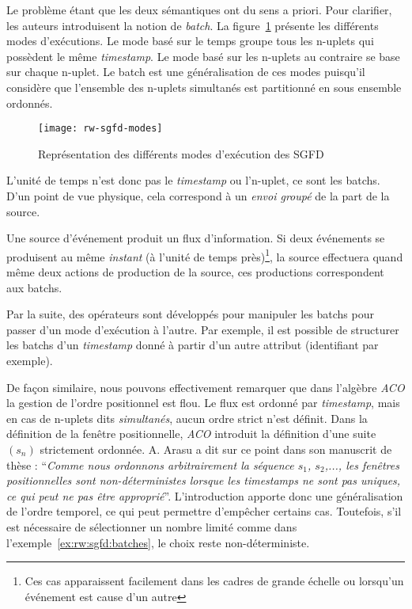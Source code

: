 Le problème étant que les deux sémantiques ont du sens a priori. Pour clarifier, les auteurs introduisent la notion de \textit{batch}. La figure~\ref{fig:rw:sgfd:modes} présente les différents modes d'exécutions. Le mode basé sur le temps groupe tous les n-uplets qui possèdent le même \textit{timestamp}. Le mode basé sur les n-uplets au contraire se base sur chaque n-uplet. Le batch est une généralisation de ces modes puisqu'il considère que l'ensemble des n-uplets simultanés est partitionné en sous ensemble ordonnés.
\begin{figure}[ht]
    \centering
    \texttt{[image: rw-sgfd-modes]}
    \caption{Représentation des différents modes d'exécution des SGFD}\label{fig:rw:sgfd:modes}
\end{figure}
L'unité de temps n'est donc pas le \textit{timestamp} ou l'n-uplet, ce sont les batchs. D'un point de vue physique, cela correspond à un \textit{envoi groupé} de la part de la source.
\begin{example}
Une source d'événement produit un flux d'information. Si deux événements se produisent au même \textit{instant} (à l'unité de temps près)\footnote{Ces cas apparaissent facilement dans les cadres de grande échelle ou lorsqu'un événement est cause d'un autre}, la source effectuera quand même deux actions de production de la source, ces productions correspondent aux batchs.
\end{example}

Par la suite, des opérateurs sont développés pour manipuler les batchs pour passer d'un mode d'exécution à l'autre. Par exemple, il est possible de structurer les batchs d'un \textit{timestamp} donné à partir d'un autre attribut (identifiant par exemple).

De façon similaire, nous pouvons effectivement remarquer que dans l'algèbre \textit{ACO} la gestion de l'ordre positionnel est flou. Le flux est ordonné par \textit{timestamp}, mais en cas de n-uplets dits \textit{simultanés}, aucun ordre strict n'est définit. Dans la définition de la fenêtre positionnelle, \textit{ACO} introduit la définition d'une suite $(s_n)$ strictement ordonnée. A. Arasu a dit sur ce point dans son manuscrit de thèse : \enquote{\it Comme nous ordonnons arbitrairement la séquence $s_1$, $s_2$,..., les fenêtres positionnelles sont non-déterministes lorsque les \textit{timestamps} ne sont pas uniques, ce qui peut ne pas être approprié}. L'introduction apporte donc une généralisation de l'ordre temporel, ce qui peut permettre d'empêcher certains cas. Toutefois, s'il est nécessaire de sélectionner un nombre limité comme dans l'exemple~\ref{ex:rw:sgfd:batches}, le choix reste non-déterministe.

